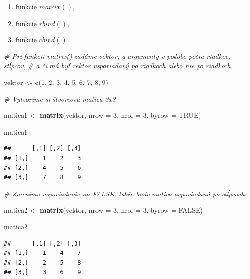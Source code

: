 \documentclass[]{article}
\newenvironment{Shaded}{\begin{snugshade}}{\end{snugshade}}
\newcommand{\CommentTok}[1]{\textcolor[rgb]{0.56,0.35,0.01}{\textit{#1}}}
\newcommand{\DataTypeTok}[1]{\textcolor[rgb]{0.13,0.29,0.53}{#1}}
\newcommand{\DecValTok}[1]{\textcolor[rgb]{0.00,0.00,0.81}{#1}}
\newcommand{\KeywordTok}[1]{\textcolor[rgb]{0.13,0.29,0.53}{\textbf{#1}}}
\newcommand{\NormalTok}[1]{#1}
\newcommand{\OtherTok}[1]{\textcolor[rgb]{0.56,0.35,0.01}{#1}}
\newcommand{\StringTok}[1]{\textcolor[rgb]{0.31,0.60,0.02}{#1}}
\providecommand{\tightlist}{%
  \setlength{\itemsep}{0pt}\setlength{\parskip}{0pt}}
\begin{document}
\begin{enumerate}
\def\labelenumi{\arabic{enumi}.}
\tightlist
\item
  funkcie \(matrix()\),
\item
  funkcie \(rbind()\),
\item
  funkcie \(cbind()\).
\end{enumerate}

\begin{Shaded}
\begin{Highlighting}[]
\CommentTok{# Pri funkcií matrix() zadáme vektor, a argumenty v podobe počtu riadkov, stĺpcov,}
\CommentTok{# a či má byť vektor usporiadaný po riadkoch alebo nie po riadkoch.}

\NormalTok{vektor <-}\StringTok{ }\KeywordTok{c}\NormalTok{(}\DecValTok{1}\NormalTok{, }\DecValTok{2}\NormalTok{, }\DecValTok{3}\NormalTok{, }\DecValTok{4}\NormalTok{, }\DecValTok{5}\NormalTok{, }\DecValTok{6}\NormalTok{, }\DecValTok{7}\NormalTok{, }\DecValTok{8}\NormalTok{, }\DecValTok{9}\NormalTok{)}

\CommentTok{# Vytvoríme si štvorcovú maticu 3x3}

\NormalTok{matica1 <-}\StringTok{ }\KeywordTok{matrix}\NormalTok{(vektor, }\DataTypeTok{nrow =} \DecValTok{3}\NormalTok{, }\DataTypeTok{ncol =} \DecValTok{3}\NormalTok{, }\DataTypeTok{byrow =} \OtherTok{TRUE}\NormalTok{)}

\NormalTok{matica1}
\end{Highlighting}
\end{Shaded}

\begin{verbatim}
##      [,1] [,2] [,3]
## [1,]    1    2    3
## [2,]    4    5    6
## [3,]    7    8    9
\end{verbatim}

\begin{Shaded}
\begin{Highlighting}[]
\CommentTok{# Zmeníme usporiadanie na FALSE, takže bude matica usporiadaná po stĺpcoch.}

\NormalTok{matica2 <-}\StringTok{ }\KeywordTok{matrix}\NormalTok{(vektor, }\DataTypeTok{nrow =} \DecValTok{3}\NormalTok{, }\DataTypeTok{ncol =} \DecValTok{3}\NormalTok{, }\DataTypeTok{byrow =} \OtherTok{FALSE}\NormalTok{)}

\NormalTok{matica2}
\end{Highlighting}
\end{Shaded}

\begin{verbatim}
##      [,1] [,2] [,3]
## [1,]    1    4    7
## [2,]    2    5    8
## [3,]    3    6    9
\end{verbatim}
\end{document}
